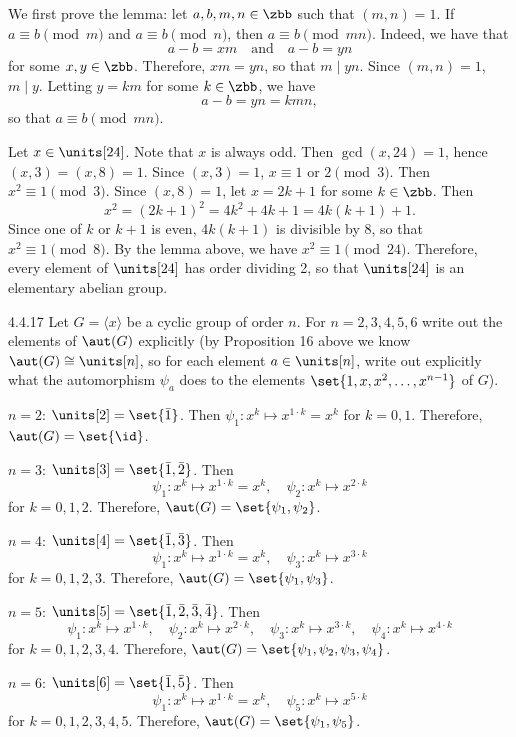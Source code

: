 \begin{sol}
	We first prove the lemma: let $a, b, m, n \in \zbb$ such that $(m, n) = 1$.
	If $a \equiv b \pmod m$ and $a \equiv b \pmod n$, then $a \equiv b \pmod{mn}$.
	Indeed, we have that
	\[
		a - b = xm \quad \text{and} \quad a - b = yn
	\]
	for some $x, y \in \zbb$.
	Therefore, $xm = yn$, so that $m \mid yn$.
	Since $(m, n) = 1$, $m \mid y$.
	Letting $y = km$ for some $k \in \zbb$, we have
	\[
		a - b = yn = kmn,
	\]
	so that $a \equiv b \pmod{mn}$.

	Let $x \in \units[24]$.
	Note that $x$ is always odd.
	Then $\gcd(x, 24) = 1$, hence $(x, 3) = (x, 8) = 1$.
	Since $(x, 3) = 1$, $x \equiv 1$ or $2 \pmod 3$.
	Then $x^2 \equiv 1 \pmod 3$.
	Since $(x, 8) = 1$, let $x = 2k + 1$ for some $k \in \zbb$.
	Then
	\[
		x^2 = (2k + 1)^2 = 4k^2 + 4k + 1 = 4k(k + 1) + 1.
	\]
	Since one of $k$ or $k + 1$ is even, $4k(k + 1)$ is divisible by 8, so that $x^2 \equiv 1 \pmod 8$.
	By the lemma above, we have $x^2 \equiv 1 \pmod 24$.
	Therefore, every element of $\units[24]$ has order dividing 2, so that $\units[24]$ is an elementary abelian group.
\end{sol}

\begin{exercise}{4.4.17}
	Let $G=\langle x\rangle$ be a cyclic group of order $n$.
	For $n=2,3,4,5,6$ write out the elements of $\aut(G)$ explicitly (by Proposition 16 above we know $\aut(G)\cong\units[n]$, so for each element $a\in\units[n]$, write out explicitly what the automorphism $\psi_a$ does to the elements $\set{1,x,x^2,\ldots,x^{n-1}}$ of $G$).
\end{exercise}

\begin{solitem}
	\item $n = 2$: $\units[2] = \set{\bar 1}$.
	Then $\psi_1 \colon x^k \mapsto x^{1 \cdot k} = x^k$ for $k = 0, 1$.
	Therefore, $\aut(G) = \set{\id}$.
	\item $n = 3$: $\units[3] = \set{\bar 1, \bar 2}$.
	Then
	\[
		\psi_1 \colon x^k \mapsto x^{1 \cdot k} = x^k, \quad \psi_2 \colon x^k \mapsto x^{2 \cdot k}
	\]
	for $k = 0, 1, 2$.
	Therefore, $\aut(G) = \set{\psi_1, \psi_2}$.
	\item $n = 4$: $\units[4] = \set{\bar 1, \bar 3}$.
	Then
	\[
		\psi_1 \colon x^k \mapsto x^{1 \cdot k} = x^k, \quad \psi_3 \colon x^k \mapsto x^{3 \cdot k}
	\]
	for $k = 0, 1, 2, 3$.
	Therefore, $\aut(G) = \set{\psi_1, \psi_3}$.
	\item $n = 5$: $\units[5] = \set{\bar 1, \bar 2, \bar 3, \bar 4}$.
	Then
	\[
		\psi_1 \colon x^k \mapsto x^{1 \cdot k}, \quad \psi_2 \colon x^k \mapsto x^{2 \cdot k}, \quad \psi_3 \colon x^k \mapsto x^{3 \cdot k}, \quad \psi_4 \colon x^k \mapsto x^{4 \cdot k}
	\]
	for $k = 0, 1, 2, 3, 4$.
	Therefore, $\aut(G) = \set{\psi_1, \psi_2, \psi_3, \psi_4}$.
	\item $n = 6$: $\units[6] = \set{\bar 1, \bar 5}$.
	Then
	\[
		\psi_1 \colon x^k \mapsto x^{1 \cdot k} = x^k, \quad \psi_5 \colon x^k \mapsto x^{5 \cdot k}
	\]
	for $k = 0, 1, 2, 3, 4, 5$.
	Therefore, $\aut(G) = \set{\psi_1, \psi_5}$.
\end{solitem}

